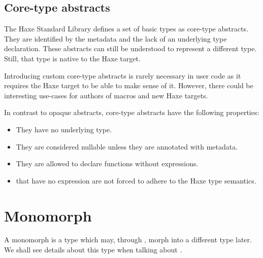 \subsection{Core-type abstracts}
\label{types-abstract-core-type}

The Haxe Standard Library defines a set of basic types as core-type abstracts. They are identified by the  metadata and the lack of an underlying type declaration. These abstracts can still be understood to represent a different type. Still, that type is native to the Haxe target. 

Introducing custom core-type abstracts is rarely necessary in user code as it requires the Haxe target to be able to make sense of it. However, there could be interesting use-cases for authors of macros and new Haxe targets.

In contrast to opaque abstracts, core-type abstracts have the following properties:

\begin{itemize}
	\item They have no underlying type.
	\item They are considered nullable unless they are annotated with  metadata.
	\item They are allowed to declare  functions without expressions.
	\item {} that have no expression are not forced to adhere to the Haxe type semantics.
\end{itemize}



\section{Monomorph}
\label{types-monomorph}

A monomorph is a type which may, through , morph into a different type later. We shall see details about this type when talking about .
